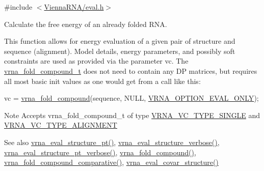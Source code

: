 {\ttfamily \#include $<$\hyperlink{eval_8h}{Vienna\+R\+N\+A/eval.\+h}$>$}



Calculate the free energy of an already folded R\+N\+A. 

This function allows for energy evaluation of a given pair of structure and sequence (alignment). Model details, energy parameters, and possibly soft constraints are used as provided via the parameter \textquotesingle{}vc\textquotesingle{}. The \hyperlink{group__fold__compound_ga1b0cef17fd40466cef5968eaeeff6166}{vrna\+\_\+fold\+\_\+compound\+\_\+t} does not need to contain any D\+P matrices, but requires all most basic init values as one would get from a call like this\+: 
\begin{DoxyCode}
vc = \hyperlink{group__fold__compound_ga6601d994ba32b11511b36f68b08403be}{vrna\_fold\_compound}(sequence, NULL, \hyperlink{group__fold__compound_ga61469c423131552c8483229f8b6c7e0e}{VRNA\_OPTION\_EVAL\_ONLY});
\end{DoxyCode}


\begin{DoxyNote}{Note}
Accepts vrna\+\_\+fold\+\_\+compound\+\_\+t of type \hyperlink{group__fold__compound_gga01a4ff86fa71deaaa5d1abbd95a1447da1608d3aa78905fc39e0d25a624ac9512}{V\+R\+N\+A\+\_\+\+V\+C\+\_\+\+T\+Y\+P\+E\+\_\+\+S\+I\+N\+G\+L\+E} and \hyperlink{group__fold__compound_gga01a4ff86fa71deaaa5d1abbd95a1447da056345f1bcfe7cd595d1fd437c05246d}{V\+R\+N\+A\+\_\+\+V\+C\+\_\+\+T\+Y\+P\+E\+\_\+\+A\+L\+I\+G\+N\+M\+E\+N\+T}
\end{DoxyNote}
\begin{DoxySeeAlso}{See also}
\hyperlink{group__eval_gadbd09372ddfd7a450bbd590c96a6bfe4}{vrna\+\_\+eval\+\_\+structure\+\_\+pt()}, \hyperlink{group__eval_ga0928d699d310178f84ee2351034e5cb5}{vrna\+\_\+eval\+\_\+structure\+\_\+verbose()}, \hyperlink{group__eval_ga8a517cfeeae8c376ae7b1e0c401d38b4}{vrna\+\_\+eval\+\_\+structure\+\_\+pt\+\_\+verbose()}, \hyperlink{group__fold__compound_ga6601d994ba32b11511b36f68b08403be}{vrna\+\_\+fold\+\_\+compound()}, \hyperlink{group__fold__compound_gad6bacc816af274922b13d947f708aa0c}{vrna\+\_\+fold\+\_\+compound\+\_\+comparative()}, \hyperlink{group__eval_ga6cea75c0eb9857fb59172be54cab09e0}{vrna\+\_\+eval\+\_\+covar\+\_\+structure()}
\end{DoxySeeAlso}

